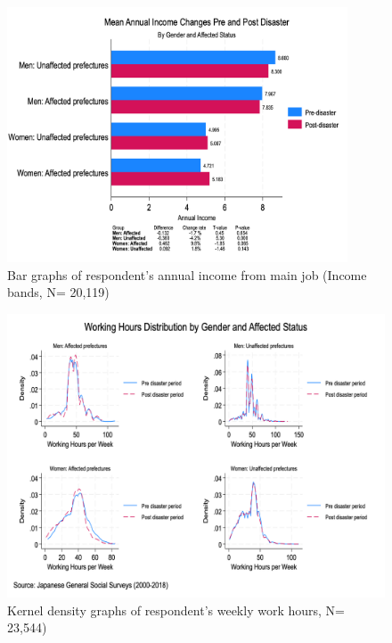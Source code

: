 \documentclass[a4paper,12pt]{article}
\begin{document}
\begin{figure}[h!]
    \centering
    \includegraphics[width=0.9\textwidth]{income_changes_table.png}  %
    \caption{Bar graphs of respondent’s annual income from main job (Income bands, N= 20,119)}

\end{figure}



\begin{figure}[h!]
    \centering
    \caption{Kernel density graphs of respondent’s weekly work hours, N= 23,544)}
    \label{fig:working_hours}
    \includegraphics[width=1.0\textwidth]{workinghours_distribution_combined.png} 
    
\end{figure}
\end{document}
